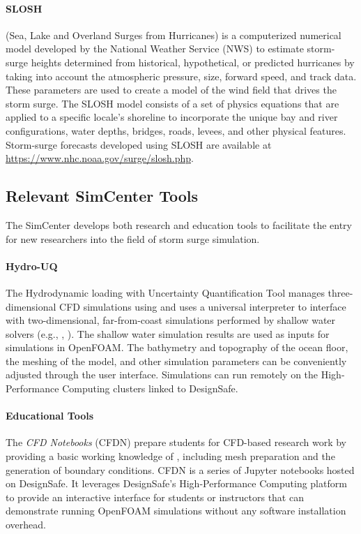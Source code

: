 \paragraph{SLOSH}  (Sea, Lake and Overland Surges from Hurricanes) is a computerized numerical model developed by the National Weather Service (NWS) to estimate storm-surge heights determined from historical, hypothetical, or predicted hurricanes by taking into account the atmospheric pressure, size, forward speed, and track data. These parameters are used to create a model of the wind field that drives the storm surge. The SLOSH model consists of a set of physics equations that are applied to a specific locale's shoreline to incorporate the unique bay and river configurations, water depths, bridges, roads, levees, and other physical features. Storm-surge forecasts developed using SLOSH are available at \url{https://www.nhc.noaa.gov/surge/slosh.php}.

\subsection{Relevant SimCenter Tools}

The SimCenter develops both research and education tools to facilitate the entry for new researchers into the field of storm surge simulation.

\paragraph{Hydro-UQ} The Hydrodynamic loading with Uncertainty Quantification Tool  manages three-dimensional CFD simulations using  and uses a universal interpreter to interface with two-dimensional, far-from-coast simulations performed by shallow water solvers (e.g., , ). The shallow water simulation results are used as inputs for simulations in OpenFOAM. The bathymetry and topography of the ocean floor, the meshing of the model, and other simulation parameters can be conveniently adjusted through the user interface. Simulations can run remotely on the High-Performance Computing clusters linked to DesignSafe.

\paragraph{Educational Tools} 
The \emph{CFD Notebooks} (CFDN) prepare students for CFD-based research work by providing a basic working knowledge of , including mesh preparation and the generation of boundary conditions. CFDN is a series of Jupyter notebooks hosted on DesignSafe. It leverages DesignSafe's High-Performance Computing platform to provide an interactive interface for students or instructors that can demonstrate running OpenFOAM simulations without any software installation overhead.

